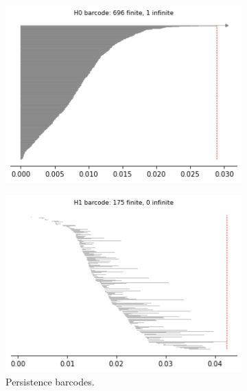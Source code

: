 \begin{figure}[H]
\begin{subfigure}[b]{0.25\textwidth}
\end{subfigure}
\begin{subfigure}[b]{0.24\textwidth}
    \includegraphics[width=\textwidth]{figures/topology/X3_H0_barcode.png}
    \caption{}
\end{subfigure}
\begin{subfigure}[b]{0.24\textwidth}
    \includegraphics[width=\textwidth]{figures/topology/X3_H1_barcode.png}
        \caption{Persistence barcodes.}
\end{subfigure}
\begin{subfigure}[b]{0.24\textwidth}

\end{subfigure}
\end{figure}
